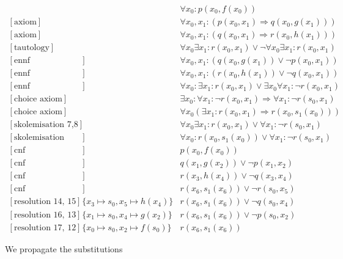 \documentclass[onehalfspacing]{article}
\begin{document}
\setcounter{equation}{0}
\begin{align}
	[\text{axiom}] && \forall x_0: p(x_0,f(x_0))\\
	[\text{axiom}] && \forall x_0, x_1 : (p(x_0,x_1) \Rightarrow q(x_0,g(x_1)))\\
	[\text{axiom}] && \forall x_0, x_1 : (q(x_0,x_1) \Rightarrow r(x_0,h(x_1)))\\
	[\text{tautology}] &&\forall  x_0 \exists x_1 : r(x_0,x_1)\vee \neg\forall  x_0 \exists x_1 : r(x_0,x_1)\\
	[\text{ennf transformation 2}] && \forall x_0, x_1 : (q(x_0,g(x_1)) \vee \neg p(x_0,x_1)) \\
	[\text{ennf transformation 3}] &&\forall x_0, x_1 : (r(x_0,h(x_1)) \vee \neg q(x_0, x_1)) \\
	[\text{ennf transformation 4}] && \forall  x_0 : \exists x_1 : r(x_0,x_1)\vee \exists x_0 \forall x_1 : \neg r(x_0, x_1)\\
	[\text{choice axiom}] && \exists x_0 : \forall x_1 : \neg r(x_0, x_1) \Rightarrow \forall x_1 : \neg r(s_0,x_1)\\
	[\text{choice axiom}] &&\forall x_0(\exists x_1: r(x_0, x_1)\Rightarrow r(x_0, s_1(x_0)))\\
	[\text{skolemisation 7,8}] && \forall  x_0 \exists x_1 : r(x_0,x_1)\vee \forall x_1 : \neg r(s_0, x_1)\\
	[\text{skolemisation 9,10}] && \forall  x_0 :  r(x_0, s_1(x_0))\vee \forall x_1 : \neg r(s_0, x_1)\\
	[\text{cnf transformation 1}] && p(x_0,f(x_0))\\
	[\text{cnf transformation 5}] && q(x_1,g(x_2)) \vee \neg p(x_1, x_2)\\
	[\text{cnf transformation 6}] && r(x_3,h(x_4)) \vee \neg q(x_3, x_4)\\
	[\text{cnf transformation 11}] && r(x_6, s_1(x_6))\vee\neg r(s_0, x_5)\\
	[\text{resolution 14, 15}] &\{x_3\mapsto s_0, x_5\mapsto h(x_4)\}&r(x_6, s_1(x_6))\vee \neg q(s_0,x_4)\\
	[\text{resolution 16, 13}] &\{x_1\mapsto s_0, x_4\mapsto g(x_2)\}&r(x_6, s_1(x_6))\vee\neg p(s_0,x_2)\\
	[\text{resolution 17, 12}] &\{x_0\mapsto s_0, x_2\mapsto f(s_0)\}&r(x_6, s_1(x_6))
\end{align}

We propagate the substitutions
\end{document}
